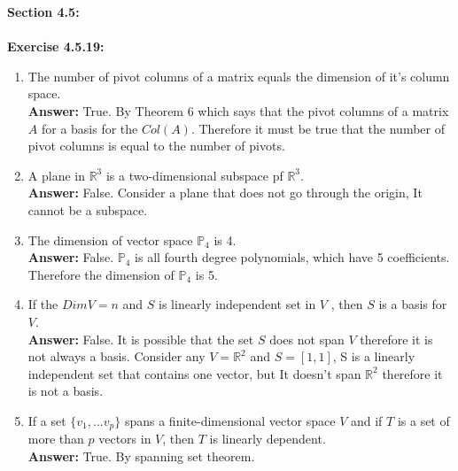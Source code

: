 \documentclass{amsart}
\def\RR{{\mathbb R}}
\def\PP{{\mathbb P}}
\begin{document}
\thispagestyle{fancy}





{\huge\textbf{Section 4.5:}}\\\\
\noindent\textbf{Exercise 4.5.19: }
\begin{enumerate}

\item The number of pivot columns of a matrix equals the dimension of it's column space.\\
\noindent \textbf{Answer: } True. By Theorem 6 which says that the pivot columns of a matrix $A$ for a basis for the $Col(A)$. Therefore it must be true that the number of pivot columns is equal to the number of pivots.
\vspace{1in}


\item A plane in $\RR^{3}$ is a two-dimensional subspace pf $\RR^3$.\\
\noindent \textbf{Answer: } False. Consider a plane that does not go through the origin, It cannot be a subspace.
\vspace{1in}


\item The dimension of vector space $\PP_4$ is 4.\\
\noindent \textbf{Answer: } False. $\PP_4$ is all fourth degree polynomials, which have 5 coefficients. Therefore the dimension of $\PP_4$ is 5.\\
\vspace{1in}


\item If the $Dim V = n$ and $S$ is linearly independent set in $V$ , then $S$ is a basis for $V$.\\
\noindent \textbf{Answer: } False. It is possible that the set $S$ does not span $V$ therefore it is not always a basis. Consider any $V= \RR^2$ and $S = [1,1]$, S is a linearly independent set that contains one vector, but It doesn't span $\RR^2$  therefore it is not a basis.
\vspace{1in}


\item If a set $\{v_1,...v_p \}$ spans a finite-dimensional vector space $V$ and if $T$ is a set of more than $p$ vectors in $V$, then $T$ is linearly dependent.\\
\noindent \textbf{Answer: } True. By spanning set theorem.
\vspace{1in}
 
 
 \end{enumerate}
\end{document}
